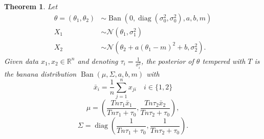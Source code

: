\documentclass[english,twoside,openright]{HYgraduMLDS}
\newtheorem{theorem}{Theorem}
\newcommand{\R}{\mathbb{R}}
\newcommand{\caln}{{\mathcal{N}}}
\DeclareMathOperator{\ban}{Ban}
\DeclareMathOperator{\diag}{diag}
\begin{document}
\begin{theorem}\label{banana_posterior_theorem}
    Let
    \begin{align*}
        \theta = (\theta_1, \theta_2) &\sim
        \ban(0, \diag(\sigma_0^2, \sigma_0^2), a, b, m) \\
        X_1 &\sim \caln(\theta_1, \sigma_1^2) \\
        X_2 &\sim \caln(\theta_2 + a(\theta_1 - m)^2 + b, \sigma_2^2).
    \end{align*}
    Given data \(x_1, x_2\in \R^n\) and
    denoting \(\tau_i = \frac{1}{\sigma_i^2}\),
    the posterior of \(\theta\) tempered with \(T\) is the banana distribution
    \(\ban(\mu, \Sigma, a, b, m)\)
    with
    \[
        \bar{x}_i = \frac{1}{n}\sum_{j=1}^n x_{ji} \quad i\in \{1, 2\}
    \]
    \[
        \mu = \left(\frac{Tn\tau_1\bar{x}_1}{Tn\tau_1 + \tau_0},
        \frac{Tn\tau_2\bar{x}_2}{Tn\tau_2 + \tau_0}\right),
    \]
    \[
        \Sigma = \diag\left(
            \frac{1}{Tn\tau_1 + \tau_0},
            \frac{1}{Tn\tau_2 + \tau_0}
        \right).
    \]
\end{theorem}
\end{document}

